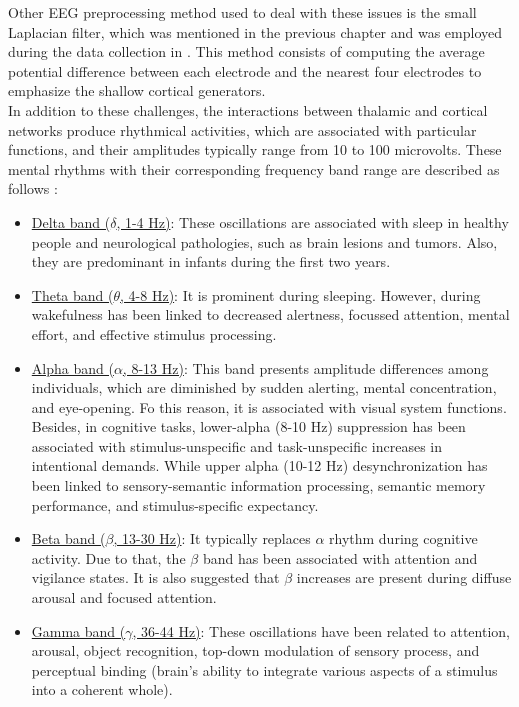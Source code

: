 Other EEG preprocessing method used to deal with these issues is the small Laplacian filter, which was mentioned in the previous chapter and was employed during the data collection in \cite{zhao2015classifying}. This method consists of computing the average potential difference between each electrode and the nearest four electrodes to emphasize the shallow cortical generators.\\

In addition to these challenges, the interactions between thalamic and cortical networks produce rhythmical activities, which are associated with particular functions, and their amplitudes typically range from 10 to 100 microvolts. These mental rhythms with their corresponding frequency band range are described as follows \cite{pizzagalli2007electroencephalography}:
\begin{itemize}
	\item \underline{Delta band ($\delta$, 1-4 Hz)}: These oscillations are associated with sleep in healthy people and neurological pathologies, such as brain lesions and tumors. Also, they are predominant in infants during the first two years.
	\item \underline{Theta band ($\theta$, 4-8 Hz)}: It is prominent during sleeping. However, during wakefulness has been linked to decreased alertness, focussed attention, mental effort, and effective stimulus processing.
	\item \underline{Alpha band ($\alpha$, 8-13 Hz)}: This band presents amplitude differences among individuals, which are diminished by sudden alerting, mental concentration, and eye-opening. Fo this reason, it is associated with visual system functions. Besides, in cognitive tasks, lower-alpha (8-10 Hz) suppression has been associated with stimulus-unspecific and task-unspecific increases in intentional demands. While upper alpha (10-12 Hz) desynchronization has been linked to sensory-semantic information processing, semantic memory performance, and stimulus-specific expectancy.
	\item \underline{Beta band ($\beta$, 13-30 Hz)}: It typically replaces $\alpha$ rhythm during cognitive activity. Due to that, the $\beta$ band has been associated with attention and vigilance states. It is also suggested that $\beta$ increases are present during diffuse arousal and focused attention.
	\item \underline{Gamma band ($\gamma$, 36-44 Hz)}: These oscillations have been related to attention, arousal, object recognition, top-down modulation of sensory process, and perceptual binding (brain's ability to integrate various aspects of a stimulus into a coherent whole).
\end{itemize}

